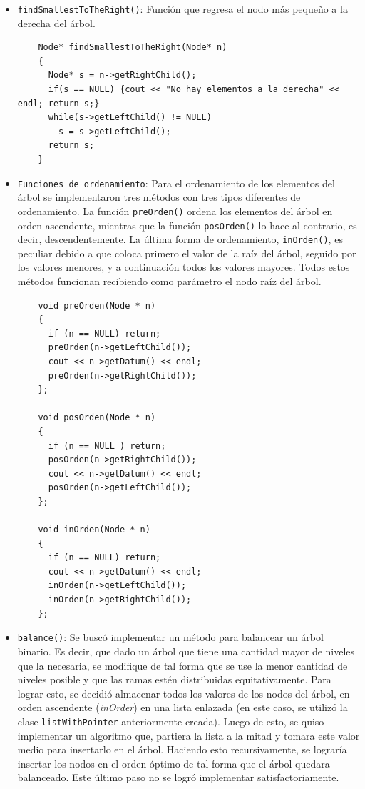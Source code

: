 \begin{itemize}
    \item \texttt{findSmallestToTheRight()}: Función que regresa el nodo más pequeño a la derecha del árbol.
    
    \begin{verbatim}
    Node* findSmallestToTheRight(Node* n)
    {
      Node* s = n->getRightChild();
      if(s == NULL) {cout << "No hay elementos a la derecha" << endl; return s;}
      while(s->getLeftChild() != NULL)
        s = s->getLeftChild();
      return s;
    }
    \end{verbatim}
    
    \item \texttt{Funciones de ordenamiento}: Para el ordenamiento de los elementos del árbol se implementaron tres métodos con tres tipos diferentes de ordenamiento. La función \texttt{preOrden()} ordena los elementos del árbol en orden ascendente, mientras que la función \texttt{posOrden()} lo hace al contrario, es decir, descendentemente. La última forma de ordenamiento, \texttt{inOrden()}, es peculiar debido a que coloca primero el valor de la raíz del árbol, seguido por los valores menores, y a continuación todos los valores mayores. Todos estos métodos funcionan recibiendo como parámetro el nodo raíz del árbol.
    
    \begin{verbatim}
    void preOrden(Node * n)
    {
      if (n == NULL) return;
      preOrden(n->getLeftChild());
      cout << n->getDatum() << endl;
      preOrden(n->getRightChild());
    };

    void posOrden(Node * n)
    {
      if (n == NULL ) return;
      posOrden(n->getRightChild());
      cout << n->getDatum() << endl;
      posOrden(n->getLeftChild());
    };

    void inOrden(Node * n)
    {
      if (n == NULL) return;
      cout << n->getDatum() << endl;
      inOrden(n->getLeftChild());
      inOrden(n->getRightChild());
    };

    \end{verbatim}
    
    \item \texttt{balance()}: Se buscó implementar un método para balancear un árbol binario. Es decir, que dado un árbol que tiene una cantidad mayor de niveles que la necesaria, se modifique de tal forma que se use la menor cantidad de niveles posible y que las ramas estén distribuidas equitativamente. Para lograr esto, se decidió almacenar todos los valores de los nodos del árbol, en orden ascendente (\textit{inOrder}) en una lista enlazada (en este caso, se utilizó la clase \texttt{listWithPointer} anteriormente creada). Luego de esto, se quiso implementar un algoritmo que, partiera la lista a la mitad y tomara este valor medio para insertarlo en el árbol. Haciendo esto recursivamente, se lograría insertar los nodos en el orden óptimo de tal forma que el árbol quedara balanceado. Este último paso no se logró implementar satisfactoriamente.
    

\end{itemize}
